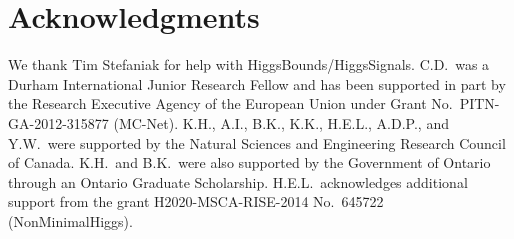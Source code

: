 \documentclass[11pt]{article}
\begin{document}
\section*{Acknowledgments}
We thank Tim Stefaniak for help with HiggsBounds/HiggsSignals.
C.D.\ was a Durham International Junior Research Fellow and has been supported in part by the Research Executive Agency of the European Union under Grant No.\ PITN-GA-2012-315877 (MC-Net).
K.H., A.I., B.K., K.K., H.E.L., A.D.P., and Y.W.\ were supported by the Natural Sciences and Engineering Research 
Council of Canada.  K.H.\ and B.K.\ were also supported by the Government of Ontario through an Ontario Graduate Scholarship.  H.E.L.\ acknowledges additional support from the grant H2020-MSCA-RISE-2014 No.\ 645722 (NonMinimalHiggs).


\end{document}
